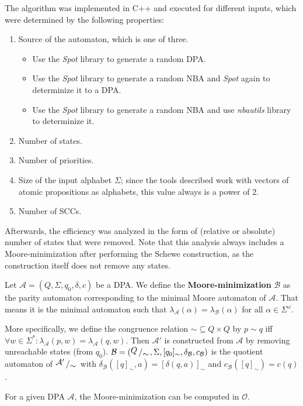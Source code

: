 The algorithm was implemented in C++ and executed for different inputs, which were determined by the following properties:
\begin{enumerate}
	\item Source of the automaton, which is one of three.
	\begin{itemize}
		\item Use the \textit{Spot} library to generate a random DPA.
		\item Use the \textit{Spot} library to generate a random NBA and \textit{Spot} again to determinize it to a DPA.
		\item Use the \textit{Spot} library to generate a random NBA and use \textit{nbautils} library to determinize it.
	\end{itemize}
	\item Number of states.
	\item Number of priorities.
	\item Size of the input alphabet $\Sigma$; since the tools described work with vectors of atomic propositions as alphabets, this value always is a power of 2.
	\item Number of SCCs.
\end{enumerate}

Afterwards, the efficiency was analyzed in the form of (relative or absolute) number of states that were removed. Note that this analysis always includes a Moore-minimization after performing the Schewe construction, as the construction itself does not remove any states.







\newpage









\begin{defn}
	Let $\mathcal{A} = (Q, \Sigma, q_0, \delta, c)$ be a DPA. We define the \textbf{Moore-minimization} $\mathcal{B}$ as the parity automaton corresponding to the minimal Moore automaton of $\mathcal{A}$. That means it is the minimal automaton such that $\lambda_\mathcal{A}(\alpha) = \lambda_\mathcal{B}(\alpha)$ for all $\alpha \in \Sigma^\omega$.
	
	More specifically, we define the congruence relation $\sim \subseteq Q \times Q$ by $p \sim q$ iff $\forall w \in \Sigma^*: \lambda_\mathcal{A}(p, w) = \lambda_\mathcal{A}(q, w)$. Then $\mathcal{A}'$ is constructed from $\mathcal{A}$ by removing unreachable states (from $q_0$). $\mathcal{B} = (\bigslant{Q}{\sim}, \Sigma, [q_0]_\sim, \delta_\mathcal{B}, c_\mathcal{B})$ is the quotient automaton of $\bigslant{\mathcal{A}'}{\sim}$ with $\delta_\mathcal{B}([q]_\sim, a) = [\delta(q, a)]_\sim$ and $c_\mathcal{B}([q]_\sim) = c(q)$.
\end{defn}

\begin{lem}
	For a given DPA $\mathcal{A}$, the Moore-minimization can be computed in $\mathcal{O}$.
\end{lem}





